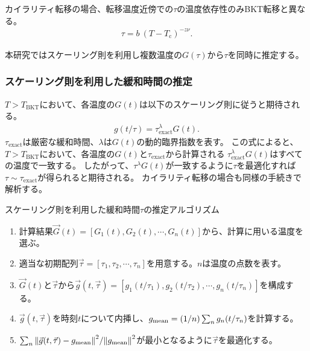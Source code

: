 \documentclass[12pt,titlepage,dvipdfmx]{jarticle}
\begin{document}
カイラリティ転移の場合、転移温度近傍での$\tau$の温度依存性のみBKT転移と異なる。
\begin{align}
   \tau = b \ (T-T_{\mathrm{c}})^{-z\nu}.
\end{align}

本研究ではスケーリング則を利用し複数温度の$G(\tau)$から$\tau$を同時に推定する。


\subsubsection{スケーリング則を利用した緩和時間の推定}

$T>T_{\mathrm{BKT}}$において、各温度の$G(t)$は以下のスケーリング則に従うと期待される\cite{Ozeki2003}。
\begin{align}
   g(t/\tau) = \tau_{\mathrm{exact}}^{\lambda}G(t).
\end{align}
$\tau_{\mathrm{exact}}$は厳密な緩和時間、$\lambda$は$G(t)$の動的臨界指数を表す。
この式によると、$T>T_{\mathrm{BKT}}$において、各温度の$G(t)$と$\tau_{\mathrm{exact}}$から計算される
$\tau_{\mathrm{exact}}^{\lambda}G(t)$はすべての温度で一致する。
したがって、$\tau^{\lambda}G(t)$が一致するように$\tau$を最適化すれば$\tau\sim\tau_{\mathrm{exact}}$が得られると期待される。
カイラリティ転移の場合も同様の手続きで解析する。
\begin{itembox}[1]{スケーリング則を利用した緩和時間$\tau$の推定アルゴリズム}
   \begin{enumerate}
       \item 計算結果$\vec{G}(t)=[G_1(t),G_2(t),\cdots,G_n(t)]$から、計算に用いる温度を選ぶ。
       \item 適当な初期配列$\vec{\tau}=[\tau_1,\tau_2,\cdots,\tau_n]$を用意する。$n$は温度の点数を表す。
       \item $\vec{G}(t)$と$\vec{\tau}$から$\vec{g}(t,\vec{\tau})=[g_1(t/\tau_1),g_2(t/\tau_2),\cdots,g_n(t/\tau_n)]$を構成する。
       \item $\vec{g}(t,\vec{\tau})$を時刻$t$について内挿し、$g_{\mathrm{mean}} = \qty(1/n) \sum_n g_n(t/\tau_n)$を計算する。
       \item $\sum_n \norm{\vec{g}(t,\vec{\tau})-g_{\mathrm{mean}}}^2/\norm{g_{\mathrm{mean}}}^2$が最小となるように$\vec{\tau}$を最適化する\cite{10.1093/comjnl/7.4.308}。
   \end{enumerate}
\end{itembox}
\newpage
\end{document}
